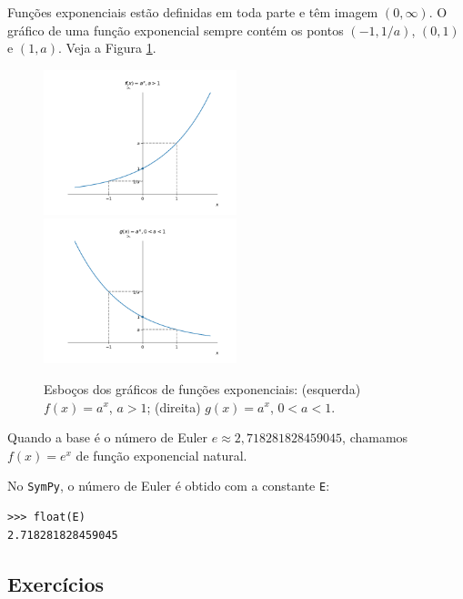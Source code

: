 Funções exponenciais estão definidas em toda parte e têm imagem $(0, \infty)$. O gráfico de uma função exponencial sempre contém os pontos $(-1,1/a)$, $(0,1)$ e $(1,a)$. Veja a Figura \ref{fig:exponencial_graficos}.

\begin{figure}[H]
  \centering
  \includegraphics[width=0.5\textwidth]{./cap_funcao/dados/fig_exponencial_graficos/fig_exponencial_2}~
  \includegraphics[width=0.5\textwidth]{./cap_funcao/dados/fig_exponencial_graficos/fig_exponencial_12}
  \caption{Esboços dos gráficos de funções exponenciais: (esquerda) $f(x) = a^x$, $a>1$; (direita) $g(x) = a^x$, $0<a<1$.}
  \label{fig:exponencial_graficos}
\end{figure}

\begin{obs}
  Quando a base é o número de Euler $e \approx 2,718281828459045$, chamamos $f(x) = e^x$ de função exponencial natural.

  \ifispython
  No \verb+SymPy+, o número de Euler é obtido com a constante \verb+E+:
\begin{verbatim}
>>> float(E)
2.718281828459045
\end{verbatim}
  \fi
\end{obs}

\subsection*{Exercícios}

\emconstrucao

